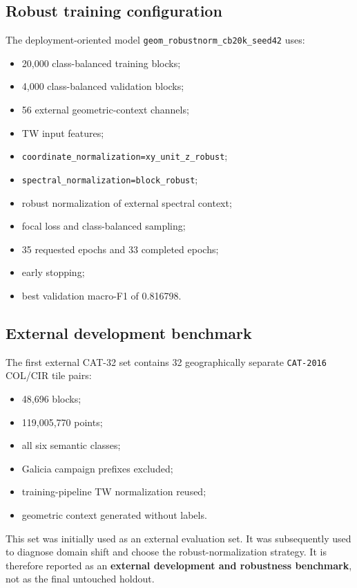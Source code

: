 \documentclass[11pt,a4paper]{article}
\newcommand{\modelrobust}{\texttt{geom\_robustnorm\_cb20k\_seed42}}
\begin{document}
\subsection{Robust training configuration}

The deployment-oriented model \modelrobust{} uses:

\begin{itemize}
  \item 20,000 class-balanced training blocks;
  \item 4,000 class-balanced validation blocks;
  \item 56 external geometric-context channels;
  \item TW input features;
  \item \texttt{coordinate\_normalization=xy\_unit\_z\_robust};
  \item \texttt{spectral\_normalization=block\_robust};
  \item robust normalization of external spectral context;
  \item focal loss and class-balanced sampling;
  \item 35 requested epochs and 33 completed epochs;
  \item early stopping;
  \item best validation macro-F1 of 0.816798.
\end{itemize}

\subsection{External development benchmark}

The first external CAT-32 set contains 32 geographically separate \texttt{CAT-2016} COL/CIR tile pairs:

\begin{itemize}
  \item 48,696 blocks;
  \item 119,005,770 points;
  \item all six semantic classes;
  \item Galicia campaign prefixes excluded;
  \item training-pipeline TW normalization reused;
  \item geometric context generated without labels.
\end{itemize}

This set was initially used as an external evaluation set. It was subsequently used to diagnose domain shift and choose the robust-normalization strategy. It is therefore reported as an \textbf{external development and robustness benchmark}, not as the final untouched holdout.
\end{document}
